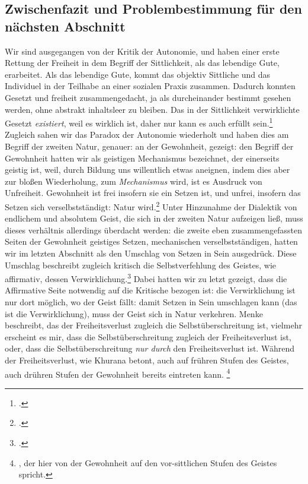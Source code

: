 \documentclass[12pt, a4paper, openany]{report}
\begin{document}
\subsection{Zwischenfazit und Problembestimmung für den nächsten Abschnitt}\label{zwisschenfazit}
Wir sind ausgegangen von der Kritik der Autonomie, und haben einer erste Rettung der Freiheit in dem Begriff der Sittlichkeit, als das lebendige Gute, erarbeitet. 
Als das lebendige Gute, kommt das objektiv Sittliche und das Individuel in der Teilhabe an einer sozialen Praxis zusammen. 
Dadurch konnten Gesetzt und freiheit zusammengedacht, ja als durcheinander bestimmt gesehen werden, ohne abstrakt inhaltsleer zu bleiben.
Das in der Sittlichkeit verwirklichte Gesetzt \emph{existiert}, weil es wirklich ist, daher nur kann es auch erfüllt sein.\footcite[Vgl.][57]{menke_autonomie_2018}
Zugleich sahen wir das Paradox der Autonomie wiederholt und haben dies am Begriff der zweiten Natur, genauer: an der Gewohnheit, gezeigt: 
den Begriff der Gewohnheit hatten wir als geistigen Mechanismus bezeichnet, der einerseits geistig ist, weil, durch Bildung uns willentlich etwas aneignen, indem dies aber zur bloßen Wiederholung, zum \emph{Mechanismus} wird, ist es Ausdruck von Unfreiheit.
Gewohnheit ist frei insofern sie ein Setzen ist, und unfrei, insofern das Setzen sich verselbstständigt: Natur wird.\footcite[Vgl.][145]{menke_autonomie_2018}
Unter Hinzunahme der Dialektik von endlichem und absolutem Geist, die sich in der zweiten Natur aufzeigen ließ, muss dieses verhältnis allerdings überdacht werden:
die zweite eben zusammengefassten Seiten der Gewohnheit geistiges Setzen, mechanischen verselbstständigen, hatten wir im letzten Abschnitt als den Umschlag von Setzen in Sein ausgedrück. 
Diese Umschlag beschreibt zugleich kritisch die Selbstverfehlung des Geistes, wie affirmativ, dessen Verwirklichung.\footcite[Vgl.][145]{menke_autonomie_2018}
Dabei hatten wir zu letzt gezeigt, dass die Affirmative Seite notwendig auf die Kritische bezogen ist: 
die Verwirklichung ist nur dort möglich, wo der Geist fällt: 
damit Setzen in Sein umschlagen kann (das ist die Verwirklichung), muss der Geist sich in Natur verkehren. 
Menke beschreibt, das der Freiheitsverlust zugleich die Selbstüberschreitung ist, vielmehr erscheint es mir, dass die Selbstüberschreitung zugleich der Freiheitsverlust ist, oder, dass die Selbstüberschreitung \emph{nur durch} den Freiheitsverlust ist. 
Während der Freiheitsverlust, wie Khurana betont, auch auf frühren Stufen des Geistes, auch drühren Stufen der Gewohnheit bereits eintreten kann.
\footnote{
    \cite[Vgl. z.B.][§88, S. 433]{khurana_freiheit_2017}, der hier von der Gewohnheit auf den vor-sittlichen Stufen des Geistes spricht.
}
\end{document}

